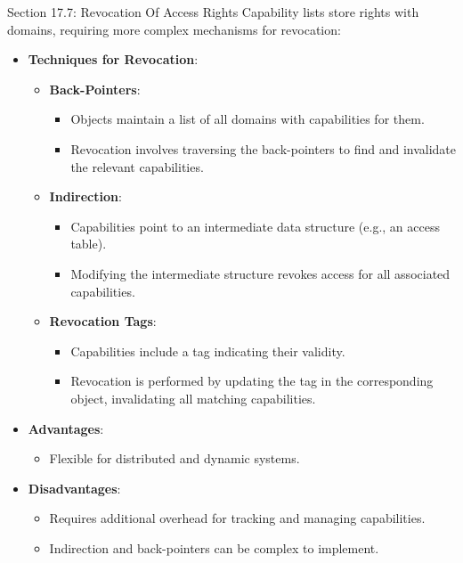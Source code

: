 \begin{notes}{Section 17.7: Revocation Of Access Rights}
    Capability lists store rights with domains, requiring more complex mechanisms for revocation:
    \begin{itemize}
        \item \textbf{Techniques for Revocation}:
        \begin{itemize}
            \item \textbf{Back-Pointers}:
            \begin{itemize}
                \item Objects maintain a list of all domains with capabilities for them.
                \item Revocation involves traversing the back-pointers to find and invalidate the relevant capabilities.
            \end{itemize}
            \item \textbf{Indirection}:
            \begin{itemize}
                \item Capabilities point to an intermediate data structure (e.g., an access table).
                \item Modifying the intermediate structure revokes access for all associated capabilities.
            \end{itemize}
            \item \textbf{Revocation Tags}:
            \begin{itemize}
                \item Capabilities include a tag indicating their validity.
                \item Revocation is performed by updating the tag in the corresponding object, invalidating all matching capabilities.
            \end{itemize}
        \end{itemize}
        \item \textbf{Advantages}:
        \begin{itemize}
            \item Flexible for distributed and dynamic systems.
        \end{itemize}
        \item \textbf{Disadvantages}:
        \begin{itemize}
            \item Requires additional overhead for tracking and managing capabilities.
            \item Indirection and back-pointers can be complex to implement.
        \end{itemize}
    \end{itemize}
    

\end{notes}
